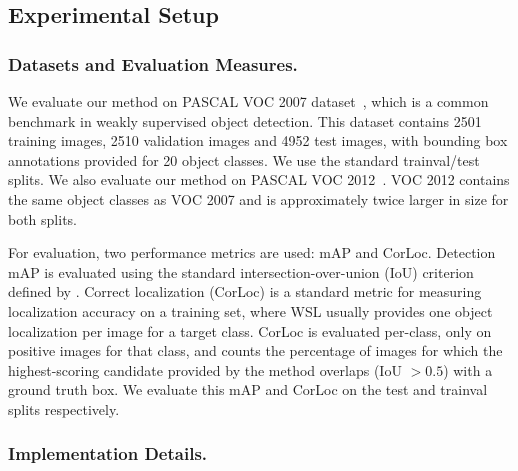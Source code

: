 \subsection{Experimental Setup} 
 \subsubsection{Datasets and Evaluation Measures.}

We evaluate our method on PASCAL VOC 2007 dataset~\cite{Everingham10}, which is
a common benchmark in weakly supervised object detection. This dataset contains
2501 training images, 2510 validation images and 4952 test images, with
bounding box annotations provided for 20 object classes. We use the standard
trainval/test splits. 
We also evaluate our method on PASCAL VOC 2012~\cite{pascal-voc-2012}. VOC 2012 contains the same 
object classes as VOC 2007 and is approximately twice larger in size for both splits.

For evaluation, two performance metrics are used: mAP and CorLoc. 
Detection mAP is evaluated using the standard
intersection-over-union (IoU) criterion defined by \cite{Everingham10}.
Correct localization (CorLoc) \cite{Deselaers:2012ci} is a standard metric 
for measuring localization accuracy on a training set, 
where WSL usually provides one object localization per image for a target class.  
CorLoc is evaluated per-class, only on positive images for
that class, and counts the percentage of images for which the highest-scoring
candidate provided by the method overlaps (IoU $> 0.5$) with a ground truth box.
We evaluate this mAP and CorLoc on the test and trainval splits respectively. 

\subsubsection{Implementation Details.}

